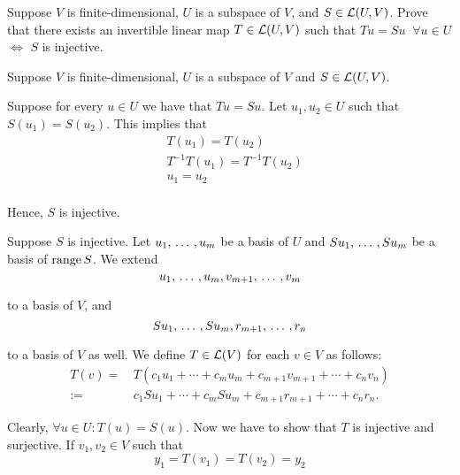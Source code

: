\begin{xrcs}
  Suppose $V$ is finite-dimensional, $U$ is a subspace of $V$, and $S \in \mathcal{L}(U,V)$. Prove that there exists an invertible linear map $T \in \mathcal{L} (U,V)$ such that $Tu = Su \; \; \forall u \in U$ $\iff$ $S$ is injective.
  \begin{xprf}
    Suppose $V$ is finite-dimensional, $U$ is a subspace of $V$ and $S \in \mathcal{L}(U,V)$.

    \Rightarrowdirection
    Suppose for every $u \in U$ we have that $Tu = Su$. Let $u_1, u_2 \in U$ such that $S(u_1) = S(u_2)$. This implies that
    \begin{equation}
      \begin{aligned}
        &T(u_1) = T(u_2) \\
        &T^{-1} T(u_1) = T^{-1} T(u_2) \\
        &u_1 = u_2 \\
      \end{aligned}
    \end{equation}

    Hence, $S$ is injective.

    \Leftarrowdirection Suppose $S$ is injective. Let $u_1, {\, \ldots \,\,}, u_m$ be a basis of $U$ and $S u_1, {\, \ldots \,\,}, S u_m$ be a basis of $\operatorname{range} S$. We extend
    \begin{equation}
      \label{eq: basis of V consisting of u's and v's}
      u_1, {\, \ldots \,\,}, u_m, v_{m+1}, {\, \ldots \,\,}, v_m
    \end{equation}

    to a basis of $V$, and
    \begin{equation}
      \label{eq: basis of V consisting of Su's and r's}
      Su_1, {\, \ldots \,\,}, Su_m, r_{m+1}, {\, \ldots \,\,}, r_{n}
    \end{equation}

    to a basis of $V$ as well. We define $T \in \mathcal{L}(V)$ for each $v \in V$ as follows:
    \begin{equation}
      \begin{aligned}
        T(v) = &\, T(c_1 u_1 + \cdots + c_m u_m + c_{m+1} v_{m+1} + \cdots + c_n v_n) \\
            := &\, c_1 S u_1 + \cdots + c_m S u_m + c_{m+1} r_{m+1} + \cdots + c_n r_n.
      \end{aligned}
    \end{equation}

    Clearly, $\forall u \in U: T(u) = S(u)$. Now we have to show that $T$ is injective and surjective. If $v_1, v_2 \in V$ such that
    \begin{equation}
      y_1 = T(v_1) = T(v_2) = y_2
    \end{equation}


\end{xprf}
\end{xrcs}
